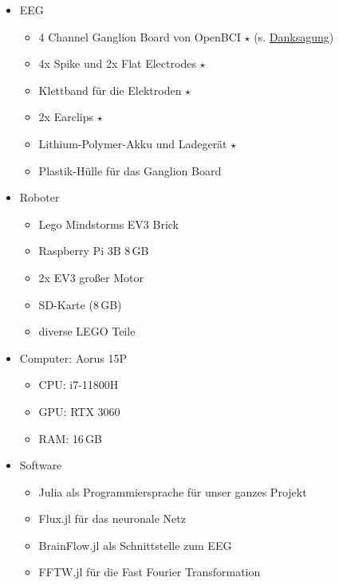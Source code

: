 \documentclass[11pt]{scrartcl}
\begin{document}
	\begin{itemize}
		\item EEG
		\begin{itemize}
			\item 4 Channel Ganglion Board von OpenBCI $\star$ (s. \hyperref[Foerderverein]{Danksagung})
			\item 4x Spike und 2x Flat Electrodes  $\star$
			\item Klettband für die Elektroden $\star$
			\item 2x Earclips $\star$
			\item Lithium-Polymer-Akku und Ladegerät $\star$
			\item Plastik-Hülle für das Ganglion Board
		\end{itemize}

		\item Roboter
		\begin{itemize}
			\item Lego Mindstorms EV3 Brick
			\item Raspberry Pi 3B 8\,GB
			\item 2x EV3 großer Motor
			\item SD-Karte (8\,GB)
			\item diverse LEGO Teile
		\end{itemize}

		\item Computer: Aorus 15P
		\begin{itemize}
			\item CPU: i7-11800H
			\item GPU: RTX 3060
			\item RAM: 16\,GB
		\end{itemize}

		\item Software
		\begin{itemize}
			\item Julia als Programmiersprache für unser ganzes Projekt \cite{julia}
			\item Flux.jl für das neuronale Netz
				\cite{Flux.jl-2018}
				\cite{innes:2018}
			
			\item BrainFlow.jl als Schnittstelle zum EEG
				\cite{brainflow}
			
			\item FFTW.jl für die Fast Fourier Transformation
				\cite{FFTW.jl-2005}
			

\end{itemize}
\end{itemize}
\end{document}
